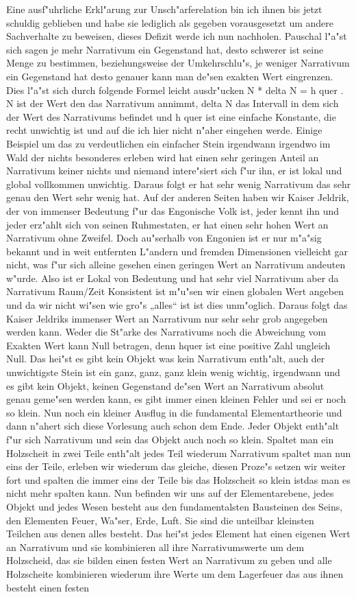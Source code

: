 \documentclass[a5paper,8pt]{book}
\begin{document}
Eine ausf"uhrliche Erkl"arung zur Unsch"arferelation bin ich ihnen bis jetzt schuldig geblieben und habe sie lediglich als gegeben vorausgesetzt um andere Sachverhalte zu beweisen, dieses Defizit werde ich nun nachholen.
Pauschal l"a"st sich sagen je mehr Narrativum ein Gegenstand hat, desto schwerer ist seine Menge zu bestimmen, beziehungsweise der Umkehrschlu"s, je weniger Narrativum ein Gegenstand hat desto genauer kann man de"sen exakten Wert eingrenzen. Dies l"a"st sich durch folgende Formel leicht ausdr"ucken  N * delta N = h quer . N  ist der Wert den das Narrativum annimmt,  delta N  das Intervall in dem sich der Wert des Narrativums befindet und h quer ist eine einfache Konstante, die recht unwichtig ist und auf die ich hier nicht n"aher eingehen werde. Einige Beispiel um das zu verdeutlichen ein einfacher Stein irgendwann irgendwo im Wald der nichts besonderes erleben wird hat einen sehr geringen Anteil an Narrativum keiner nichts und niemand intere"siert sich f"ur ihn, er ist lokal und global vollkommen unwichtig. Daraus folgt er hat sehr wenig Narrativum das sehr genau den Wert sehr wenig hat. Auf der anderen Seiten haben wir Kaiser Jeldrik, der von immenser Bedeutung f"ur das Engonische Volk ist, jeder kennt ihn 
und jeder erz"ahlt sich von seinen Ruhmestaten, er hat einen sehr hohen Wert an Narrativum ohne Zweifel. Doch au"serhalb von Engonien ist er nur m"a"sig bekannt und in weit entfernten L"andern und fremden Dimensionen vielleicht gar nicht, was f"ur sich alleine gesehen einen geringen Wert an Narrativum andeuten w"urde. Also ist er Lokal von Bedeutung und hat sehr viel Narrativum aber da Narrativum Raum/Zeit Konsistent ist m"u"sen wir einen globalen Wert angeben und da wir nicht wi"sen wie gro"s „alles“ ist ist dies unm"oglich. Daraus folgt das Kaiser Jeldriks immenser Wert an Narrativum nur sehr sehr grob angegeben werden kann.
Weder die St"arke des Narrativums noch die Abweichung vom Exakten Wert kann Null betragen, denn hquer ist eine positive Zahl ungleich Null. Das hei"st es gibt kein Objekt was kein Narrativum enth"alt, auch der unwichtigste Stein ist ein ganz, ganz, ganz klein wenig wichtig, irgendwann und es gibt kein Objekt, keinen Gegenstand de"sen Wert an Narrativum absolut genau geme"sen werden kann, es gibt immer einen kleinen Fehler und sei er noch so klein.
\newpage
Nun noch ein kleiner Ausflug in die fundamental Elementartheorie und dann n"ahert sich diese Vorlesung auch schon dem Ende. Jeder Objekt enth"alt f"ur sich Narrativum und sein das Objekt auch noch so klein. Spaltet man ein Holzscheit in zwei Teile enth"alt jedes Teil wiederum Narrativum spaltet man nun eins der Teile, erleben wir wiederum das gleiche, diesen Proze"s setzen wir weiter fort und spalten die immer eins der Teile bis das Holzscheit so klein istdas man es nicht mehr spalten kann. Nun befinden wir uns auf der Elementarebene, jedes Objekt und jedes Wesen besteht aus den fundamentalsten Bausteinen des Seins, den Elementen Feuer, Wa"ser, Erde, Luft. Sie sind die unteilbar kleinsten Teilchen aus denen alles besteht. Das hei"st jedes Element hat einen eigenen Wert an Narrativum und sie kombinieren all ihre Narrativumswerte um dem Holzscheid, das sie bilden einen festen Wert an Narrativum zu geben und alle Holzscheite kombinieren wiederum ihre Werte um dem Lagerfeuer das aus ihnen besteht einen festen 
\end{document}
